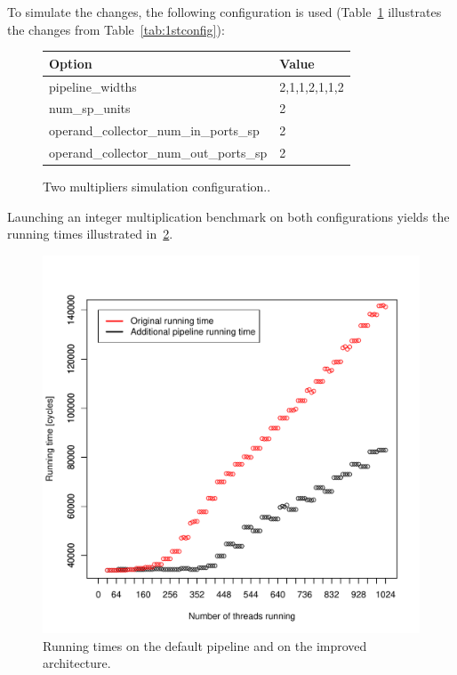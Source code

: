 \documentclass{report}
\begin{document}
    To simulate the changes, the following configuration is used (Table~\ref{tab:2ndconfig}
    illustrates the changes from Table~\ref{tab:1stconfig}):
    \begin{figure}[H]
    \centering
        \begin{tabular}{ | l | l | }
    	    \hline
    	    Option & Value \\ \hline
    	    pipeline\_widths & 2,1,1,2,1,1,2 \\
            num\_sp\_units & 2 \\
            operand\_collector\_num\_in\_ports\_sp & 2 \\
            operand\_collector\_num\_out\_ports\_sp & 2 \\ \hline
  	    \end{tabular}
  	\captionsetup{justification=centering}
  	\caption{Two multipliers simulation configuration..}
  	\label{tab:2ndconfig}
    \end{figure}

    Launching an integer multiplication benchmark on both configurations yields the running
    times illustrated in~\ref{fig:time_improvement}. 
    \begin{figure}[H]
    \centering
        \includegraphics[width=0.9\linewidth]{graphics/improvement-graph}
        \captionsetup{justification=centering}
        \caption{Running times on the default pipeline and on the improved architecture.}
        \label{fig:time_improvement}
    \end{figure}
    
\end{document}
